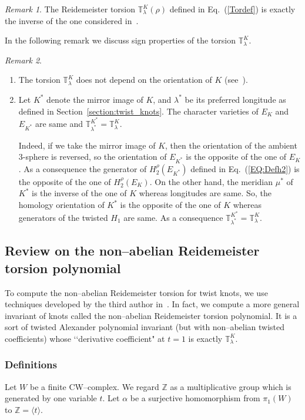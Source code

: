 \documentclass[a4paper]{amsart}
\theoremstyle{plain}
\theoremstyle{definition}
\theoremstyle{remark}
\newtheorem{remark}{Remark}%
\newcommand{\Z}{{\mathbb Z}}
\begin{document}
\begin{remark}\label{rmkinv}
The Reidemeister torsion $\mathbb{T}^K_\lambda(\rho)$ defined in Eq.~(\ref{Tordef}) is exactly the inverse of the one considered in~\cite{JDFibre}.
\end{remark}

{In the following remark we discuss sign properties of the torsion $\mathbb{T}^K_\lambda$.}
\begin{remark}\label{rmsgn}
\begin{enumerate}
  \item {The torsion $\mathbb{T}^{K}_{\lambda}$ does not depend on the orientation of $K$ (see~\cite[Proposition 3.4]{JDFibre}).}
  \item {Let $K^*$ denote the mirror image of $K$, and $\lambda^*$ be its preferred longitude as defined in Section~\ref{section:twist_knots}. The character varieties of $E_K$ and $E_{K^*}$ are same and
$\mathbb{T}^{K^*}_{\lambda^*} =  \mathbb{T}^K_\lambda.$}

{Indeed, if we take the mirror image of $K$, then the orientation of the ambient $3$-sphere is reversed, so the orientation of $E_{K^*}$ is the opposite of the one of $E_K$. As a consequence the generator of $H^\rho_2(E_{K^*})$ defined in Eq.~(\ref{EQ:Defh2}) is the opposite of the one of $H^\rho_2(E_{K})$. On the other hand, the meridian $\mu^*$ of $K^*$ is  the inverse of the one of $K$ whereas longitudes are same. So, the homology orientation of $K^*$ is the opposite of the one of $K$ whereas generators of the twisted $H_1$ are same. As a consequence $\mathbb{T}^{K^*}_{\lambda^*} =  \mathbb{T}^K_\lambda$.}
\end{enumerate}

\end{remark}

\subsection{Review on the non--abelian Reidemeister torsion polynomial}
\label{TorsionPoly}
To compute the non--abelian Reidemeister torsion for twist knots, we use techniques developed by the third author in~\cite{YY2}. In fact, we compute a more general invariant of knots called the non--abelian Reidemeister torsion polynomial. It is a sort of {twisted} Alexander polynomial invariant (but with non--abelian twisted coefficients) whose \lq\lq derivative coefficient" at $t = 1$ is exactly $\mathbb{T}^K_\lambda$.

\subsubsection*{Definitions} Let $W$ be a finite CW--complex.
We regard $\Z$ as a multiplicative group which is generated by one variable $t$.
Let $\alpha$ be a surjective homomorphism from $\pi_1(W)$ to $\Z = \langle t \rangle$. 
\end{document}
